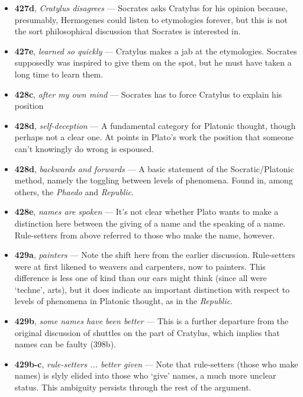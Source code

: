 \documentclass[12pt]{article}
\begin{document}
\begin{itemize}

\item \textbf{427d}, \textit{Cratylus disagrees} --- Socrates asks Cratylus for his opinion because, presumably, Hermogenes could listen to etymologies forever, but this is not the sort philosophical discussion that Socrates is interested in.

\item \textbf{427e}, \textit{learned so quickly} --- Cratylus makes a jab at the etymologies. Socrates supposedly was inspired to give them on the spot, but he must have taken a long time to learn them.

\item \textbf{428c}, \textit{after my own mind} --- Socrates has to force Cratylus to explain his position

\item \textbf{428d}, \textit{self-deception} --- A fundamental category for Platonic thought, though perhaps not a clear one. At points in Plato's work the position that someone can't knowingly do wrong is espoused.

\item \textbf{428d}, \textit{backwards and forwards} --- A basic statement of the Socratic/Platonic method, namely the toggling between levels of phenomena. Found in, among others, the \textit{Phaedo} and \textit{Republic}.

\item \textbf{428e}, \textit{names are spoken} --- It's not clear whether Plato wants to make a distinction here between the giving of a name and the speaking of a name. Rule-setters from above referred to those who make the name, however.

\item \textbf{429a}, \textit{painters} --- Note the shift here from the earlier discussion. Rule-setters were at first likened to weavers and carpenters, now to painters. This difference is less one of kind than our ears might think (since all were `techne', arts), but it does indicate an important distinction with respect to levels of phenomena in Platonic thought, as in the \textit{Republic}.

\item \textbf{429b}, \textit{some names have been better} --- This is a further departure from the original discussion of shuttles on the part of Cratylus, which implies that names can be faulty (398b).

\item \textbf{429b-c}, \textit{rule-setters ... better given} --- Note that rule-setters (those who make names) is slyly elided into those who `give' names, a much more unclear status. This ambiguity persists through the rest of the argument.


\end{itemize}
\end{document}
